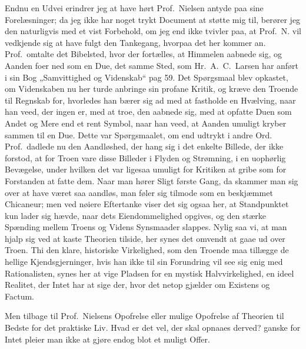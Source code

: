 Endnu en Udvei erindrer jeg at have hørt Prof.\ Nielsen antyde paa sine
Forelæsninger; da jeg ikke har noget trykt Document at støtte mig til, berører
jeg den naturligvis med et vist Forbehold, om jeg end ikke tvivler paa, at
Prof.\ N. vil vedkjende sig at have fulgt den Tankegang, hvorpaa det her
kommer an. Prof.\ omtalte det Bibelsted, hvor der fortælles, at Himmelen
aabnede sig, og Aanden foer ned som en Due, det samme Sted, som Hr.\ A.\ C.\
Larsen har anført i sin Bog „Samvittighed og Videnskab“ pag 59. Det
Spørgsmaal blev opkastet, om Videnskaben nu her turde anbringe sin profane
Kritik, og kræve den Troende til Regnskab for, hvorledes han bærer sig ad med
at fastholde en Hvælving, naar han veed, der ingen er, med at troe, den
aabnede sig, med at opfatte Duen som Andet og Mere end et rent Symbol, naar
han veed, at Aanden umuligt kryber sammen til en Due. Dette var Spørgsmaalet,
om end udtrykt i andre Ord. Prof.\ dadlede nu den Aandløshed, der
hang sig i det enkelte Billede, der ikke forstod, at for Troen vare
disse Billeder i Flyden og Strømning, i en uophørlig Bevægelse, under hvilken
det var ligesaa umuligt for Kritiken at gribe som for Forstanden at fatte dem.
Naar man hører Sligt første Gang, da skammer man sig over at have været saa
aandløs, man føler sig tilmode som en beskjæmmet Chicaneur; men ved nøiere
Eftertanke viser det sig ogsaa her, at Standpunktet kun lader sig hævde, naar
dets Eiendommelighed opgives, og den stærke Spænding mellem Troens og Videns
Synsmaader slappes. Nylig saa vi, at man hjalp sig ved at kaste Theorien
tilside, her synes det omvendt at gaae ud over Troen. Thi den klare,
historiske Virkelighed, som den Troende maa tillægge de hellige
Kjendsgjerninger, hvis han ikke til sin Forundring vil see sig enig med
Rationalisten, synes her at vige Pladsen for en mystisk Halvvirkelighed, en
ideel Realitet, der Intet har at sige der, hvor det netop gjælder om Existens
og Factum.

Men tilbage til Prof.\ Nielsens Opofrelse eller mulige Opofrelse af Theorien
til Bedste for det praktiske Liv. Hvad er det vel, der skal opnaaes derved?
ganske for Intet pleier man ikke at gjøre endog blot et muligt Offer.

